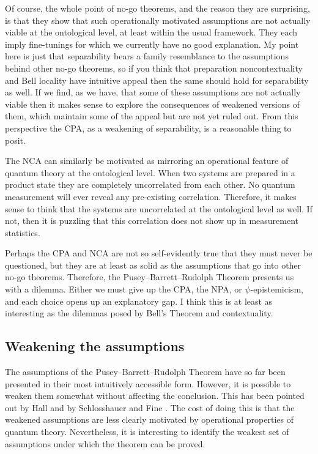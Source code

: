 \documentclass[DIV=calc,fontsize=12pt]{scrartcl} %
\theoremstyle{definition}
\theoremstyle{plain}
\begin{document}
Of course, the whole point of no-go theorems, and the reason they are
surprising, is that they show that such operationally motivated
assumptions are not actually viable at the ontological level, at least
within the usual framework.  They each imply fine-tunings for which we
currently have no good explanation.  My point here is just that
separability bears a family resemblance to the assumptions behind
other no-go theorems, so if you think that preparation
noncontextuality and Bell locality have intuitive appeal then the same
should hold for separability as well.  If we find, as we have, that
some of these assumptions are not actually viable then it makes sense
to explore the consequences of weakened versions of them, which
maintain some of the appeal but are not yet ruled out.  From this
perspective the CPA, as a weakening of separability, is a reasonable
thing to posit.

The NCA can similarly be motivated as mirroring an operational feature
of quantum theory at the ontological level.  When two systems are
prepared in a product state they are completely uncorrelated from each
other.  No quantum measurement will ever reveal any pre-existing
correlation.  Therefore, it makes sense to think that the systems are
uncorrelated at the ontological level as well.  If not, then it is
puzzling that this correlation does not show up in measurement
statistics.

Perhaps the CPA and NCA are not so self-evidently true that they must
never be questioned, but they are at least as solid as the assumptions
that go into other no-go theorems.  Therefore, the Pusey--Barrett--Rudolph Theorem
presents us with a dilemma.  Either we must give up the CPA, the NPA,
or $\psi$-epistemicism, and each choice opens up an explanatory gap.
I think this is at least as interesting as the dilemmas posed by
Bell's Theorem and contextuality.

\subsection{Weakening the assumptions}

\label{WPusey--Barrett--Rudolph}

The assumptions of the Pusey--Barrett--Rudolph Theorem have so far been presented in their
most intuitively accessible form.  However, it is possible to weaken
them somewhat without affecting the conclusion.  This has been pointed
out by Hall \cite{Hall2011} and by Schlosshauer and Fine
\cite{Schlosshauer2012}.  The cost of doing this is that the weakened
assumptions are less clearly motivated by operational properties of
quantum theory.  Nevertheless, it is interesting to identify the
weakest set of assumptions under which the theorem can be proved.
\end{document}
